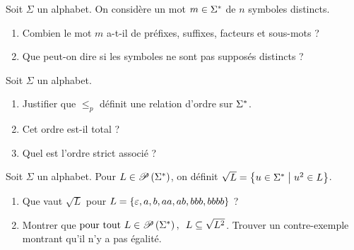 \begin{corr}
\end{corr}

\begin{exo}
Soit \(\Sigma\) un alphabet. On considère un mot \(m\in\Sigma^{*}\) de \(n\) symboles distincts.

\begin{enumerate}
    \item Combien le mot \(m\) a-t-il de préfixes, suffixes, facteurs et sous-mots ? \\
    \item Que peut-on dire si les symboles ne sont pas supposés distincts ?
\end{enumerate}
\end{exo}

\begin{corr}
\end{corr}

\begin{exo}
Soit \(\Sigma\) un alphabet.

\begin{enumerate}
    \item Justifier que \(\leq_p\) définit une relation d'ordre sur \(\Sigma^{*}\). \\
    \item Cet ordre est-il total ? \\
    \item Quel est l'ordre strict associé ?
\end{enumerate}
\end{exo}

\begin{corr}
\end{corr}

\begin{exo}
Soit \(\Sigma\) un alphabet. Pour \(L\in\mathscr{P}\left(\Sigma^{*}\right)\), on définit \(\sqrt{L}=\left\lbrace u\in\Sigma^{*}\;\middle|\; u^2\in L\right\rbrace\).

\begin{enumerate}
    \item Que vaut \(\sqrt{L}\) pour \(L=\left\lbrace\varepsilon,a,b,aa,ab,bbb,bbbb\right\rbrace\) ? \\
    \item Montrer que \(\quantifs{\tpt L\in\P{\Sigma\etoile}}L\subset\sqrt{L^2}\). Trouver un contre-exemple montrant qu'il n'y a pas égalité.
\end{enumerate}
\end{exo}

